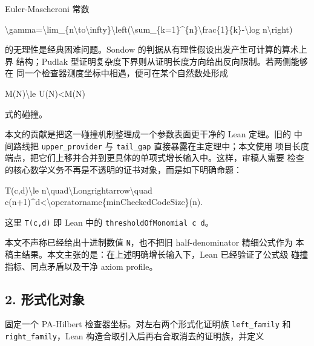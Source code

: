 \documentclass[
  a4paper,
  12pt]{ctexart}
\newenvironment{Shaded}{}{}
\newcommand{\NormalTok}[1]{#1}
\begin{document}
Euler-Mascheroni 常数

\begin{Shaded}
\begin{Highlighting}[]
\NormalTok{\textbackslash{}gamma=\textbackslash{}lim\_\{n\textbackslash{}to\textbackslash{}infty\}\textbackslash{}left(\textbackslash{}sum\_\{k=1\}\^{}\{n\}\textbackslash{}frac\{1\}\{k\}{-}\textbackslash{}log n\textbackslash{}right)}
\end{Highlighting}
\end{Shaded}

的无理性是经典困难问题。Sondow
的判据从有理性假设出发产生可计算的算术上界 结构；Pudlak
型证明复杂度下界则从证明长度方向给出反向限制。若两侧能够在
同一个检查器测度坐标中相遇，便可在某个自然数处形成

\begin{Shaded}
\begin{Highlighting}[]
\NormalTok{M(N)\textbackslash{}le U(N)\textless{}M(N)}
\end{Highlighting}
\end{Shaded}

式的碰撞。

本文的贡献是把这一碰撞机制整理成一个参数表面更干净的 Lean 定理。旧的
中间路线把 \texttt{upper\_provider} 与 \texttt{tail\_gap}
直接暴露在主定理中；本文使用
项目长度端点，把它们上移并合并到更具体的单项式增长输入中。这样，审稿人需要
检查的核心数学义务不再是不透明的证书对象，而是如下明确命题：

\begin{Shaded}
\begin{Highlighting}[]
\NormalTok{T(c,d)\textbackslash{}le n\textbackslash{}quad\textbackslash{}Longrightarrow\textbackslash{}quad}
\NormalTok{c(n+1)\^{}d\textless{}\textbackslash{}operatorname\{minCheckedCodeSize\}(n).}
\end{Highlighting}
\end{Shaded}

这里 \texttt{T(c,d)} 即 Lean 中的 \texttt{thresholdOfMonomial\ c\ d}。

本文不声称已经给出十进制数值 \texttt{N}，也不把旧 half-denominator
精细公式作为 本稿主结果。本文主张的是：在上述明确增长输入下，Lean
已经验证了公式级 碰撞指标、同点矛盾以及干净 axiom profile。

\subsection{2. 形式化对象}\label{ux5f62ux5f0fux5316ux5bf9ux8c61}

固定一个 PA-Hilbert 检查器坐标。对左右两个形式化证明族
\texttt{left\_family} 和 \texttt{right\_family}，Lean
构造合取引入后再右合取消去的证明族，并定义
\end{document}
